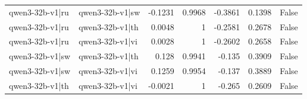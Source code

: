 \begin{table}
\begin{tabular}{l l r r r r l}
qwen3-32b-v1|ru & qwen3-32b-v1|sw & -0.1231 & 0.9968 & -0.3861 & 0.1398 & False \\
qwen3-32b-v1|ru & qwen3-32b-v1|th & 0.0048 & 1 & -0.2581 & 0.2678 & False \\
qwen3-32b-v1|ru & qwen3-32b-v1|vi & 0.0028 & 1 & -0.2602 & 0.2658 & False \\
qwen3-32b-v1|sw & qwen3-32b-v1|th & 0.128 & 0.9941 & -0.135 & 0.3909 & False \\
qwen3-32b-v1|sw & qwen3-32b-v1|vi & 0.1259 & 0.9954 & -0.137 & 0.3889 & False \\
qwen3-32b-v1|th & qwen3-32b-v1|vi & -0.0021 & 1 & -0.265 & 0.2609 & False \\
\bottomrule
\end{tabular}
\end{table}
